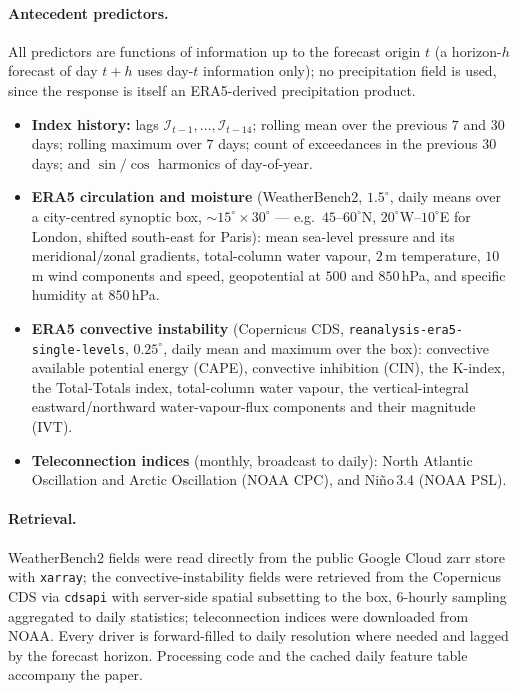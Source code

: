 \documentclass[11pt,a4paper]{article}
\newcommand{\Ind}{\mathcal{I}}                 %
\begin{document}
\paragraph{Antecedent predictors.} All predictors are functions of information up
to the forecast origin $t$ (a horizon-$h$ forecast of day $t+h$ uses day-$t$
information only); no precipitation field is used, since the response is itself an
ERA5-derived precipitation product.
\begin{itemize}[leftmargin=1.3em,itemsep=1pt]
\item \textbf{Index history:} lags $\Ind_{t-1},\dots,\Ind_{t-14}$; rolling mean
over the previous $7$ and $30$ days; rolling maximum over $7$ days; count of
exceedances in the previous $30$ days; and $\sin/\cos$ harmonics of day-of-year.
\item \textbf{ERA5 circulation and moisture} (WeatherBench2, $1.5^\circ$, daily
means over a city-centred synoptic box, $\sim15^\circ\times30^\circ$ --- e.g.\
$45$--$60^\circ$N, $20^\circ$W--$10^\circ$E for London, shifted south-east for
Paris): mean sea-level pressure and its meridional/zonal gradients, total-column water
vapour, $2$\,m temperature, $10$\,m wind components and speed, geopotential at
$500$ and $850$\,hPa, and specific humidity at $850$\,hPa.
\item \textbf{ERA5 convective instability} (Copernicus CDS,
\texttt{reanalysis-era5-single-levels}, $0.25^\circ$, daily mean and maximum over
the box): convective available potential energy (CAPE), convective inhibition
(CIN), the K-index, the Total-Totals index,
total-column water vapour, the vertical-integral eastward/northward
water-vapour-flux components and their magnitude (IVT).
\item \textbf{Teleconnection indices} (monthly, broadcast to daily): North
Atlantic Oscillation and Arctic Oscillation (NOAA CPC), and Ni\~no\,3.4 (NOAA PSL).
\end{itemize}

\paragraph{Retrieval.} WeatherBench2 fields were read directly from the public
Google Cloud zarr store with \texttt{xarray}; the convective-instability fields
were retrieved from the Copernicus CDS via \texttt{cdsapi} with server-side
spatial subsetting to the box, $6$-hourly sampling aggregated to daily statistics;
teleconnection indices were downloaded from NOAA. Every driver is forward-filled
to daily resolution where needed and lagged by the forecast horizon. Processing
code and the cached daily feature table accompany the paper.
\end{document}
